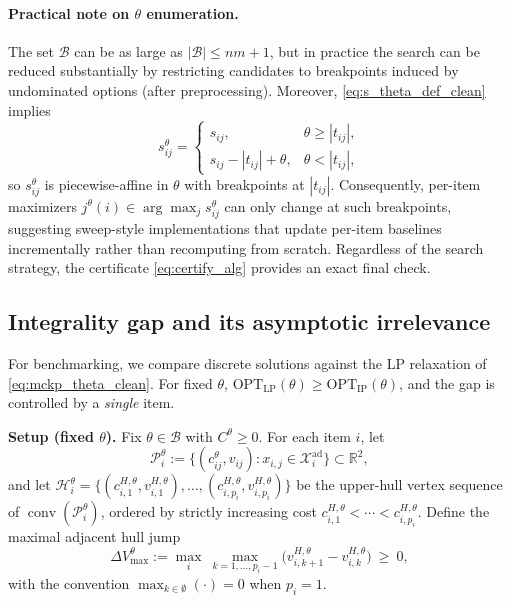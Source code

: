 \documentclass[11pt, a4paper]{article}
\theoremstyle{plain}
\theoremstyle{definition}
\theoremstyle{remark}
\begin{document}
\paragraph{Practical note on $\theta$ enumeration.}
The set $\mathcal B$ can be as large as $|\mathcal B|\le nm+1$, but in practice the search can be reduced substantially by restricting
candidates to breakpoints induced by undominated options (after preprocessing). Moreover, \eqref{eq:s_theta_def_clean} implies
\[
s^\theta_{ij}=
\begin{cases}
s_{ij}, & \theta\ge |t_{ij}|,\\
s_{ij}-|t_{ij}|+\theta, & \theta<|t_{ij}|,
\end{cases}
\]
so $s^\theta_{ij}$ is piecewise-affine in $\theta$ with breakpoints at $|t_{ij}|$. Consequently, per-item maximizers $j^\theta(i)\in\arg\max_j
s^\theta_{ij}$ can only change at such breakpoints, suggesting sweep-style implementations that update per-item baselines incrementally rather
than recomputing from scratch. Regardless of the search strategy, the certificate \eqref{eq:certify_alg} provides an exact final check.

\subsection{Integrality gap and its asymptotic irrelevance}\label{subsec:igap}

For benchmarking, we compare discrete solutions against the LP relaxation of \eqref{eq:mckp_theta_clean}. For fixed $\theta$,
$\mathrm{OPT}_{\mathrm{LP}}(\theta)\ge \mathrm{OPT}_{\mathrm{IP}}(\theta)$, and the gap is controlled by a \emph{single} item.

\medskip
\noindent\textbf{Setup (fixed $\theta$).}
Fix $\theta\in\mathcal B$ with $C^\theta\ge 0$. For each item $i$, let
\[
\mathcal P_i^\theta:=\{(c^\theta_{ij},v_{ij}) : x_{i,j}\in\mathcal X_i^{\mathrm{ad}}\}\subset\mathbb R^2,
\]
and let $\mathcal H_i^\theta=\{(c^{H,\theta}_{i,1},v^{H,\theta}_{i,1}),\dots,(c^{H,\theta}_{i,p_i},v^{H,\theta}_{i,p_i})\}$
be the upper-hull vertex sequence of $\operatorname{conv}(\mathcal P_i^\theta)$, ordered by strictly increasing cost
$c^{H,\theta}_{i,1}<\cdots<c^{H,\theta}_{i,p_i}$.
Define the maximal adjacent hull jump
\[
\Delta V_{\max}^\theta
:=\max_{i}\ \max_{k=1,\dots,p_i-1}\big(v^{H,\theta}_{i,k+1}-v^{H,\theta}_{i,k}\big)\ \ge\ 0,
\]
with the convention $\max_{k\in\emptyset}(\cdot)=0$ when $p_i=1$.
\end{document}
